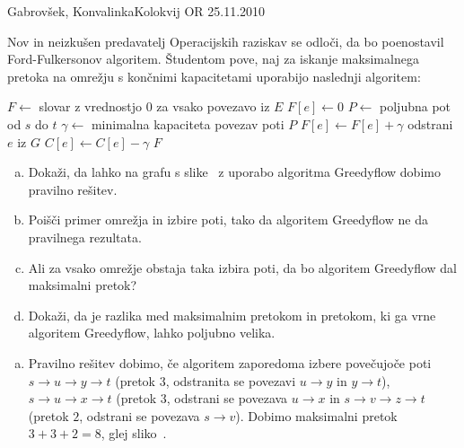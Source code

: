 \begin{naloga}{Gabrovšek, Konvalinka}{Kolokvij OR 25.11.2010}
\begin{vprasanje}
Nov in neizkušen predavatelj Operacijskih raziskav se odloči,
da bo poenostavil Ford-Fulkersonov algoritem.
Študentom pove,
naj za iskanje maksimalnega pretoka na omrežju s končnimi kapacitetami
uporabijo naslednji algoritem:
\begin{small}
\begin{algorithmic}
    \State $F \gets$ slovar z vrednostjo $0$ za vsako povezavo iz $E$
        \State $F[e] \gets 0$
    \EndFor
        \State $P \gets$ poljubna pot od $s$ do $t$
        \State $\gamma \gets$ minimalna kapaciteta povezav poti $P$
            \State $F[e] \gets F[e] + \gamma$
                \State odstrani $e$ iz $G$
            \Else
                \State $C[e] \gets C[e] - \gamma$
            \EndIf
        \EndFor
    \EndWhile
    \State \Return $F$
\EndFunction
\end{algorithmic}
\end{small}

\begin{enumerate}[(a)]
\item Dokaži,
da lahko na grafu s slike~\fig
z uporabo algoritma {\sc Greedyflow} dobimo pravilno rešitev.

\item Poišči primer omrežja in izbire poti,
tako da algoritem {\sc Greedyflow} ne da pravilnega rezultata.

\item Ali za vsako omrežje obstaja taka izbira poti,
da bo algoritem {\sc Greedyflow} dal maksimalni pretok?

\item Dokaži, da je razlika med maksimalnim pretokom in pretokom,
ki ga vrne algoritem {\sc Greedyflow}, lahko poljubno velika.
\end{enumerate}

\begin{slika}
\pgfslika
{}
\end{slika}
\end{vprasanje}

\begin{odgovor}
\begin{enumerate}[(a)]
\item Pravilno rešitev dobimo,
če algoritem zaporedoma izbere povečujoče poti $s \to u \to y \to t$
(pretok $3$, odstranita se povezavi $u \to y$ in $y \to t$),
$s \to u \to x \to t$ (pretok $3$, odstrani se povezava $u \to x$
in $s \to v \to z \to t$ (pretok $2$, odstrani se povezava $s \to v$).
Dobimo maksimalni pretok $3+3+2 = 8$, glej sliko~.


\end{enumerate}
\end{odgovor}
\end{naloga}
